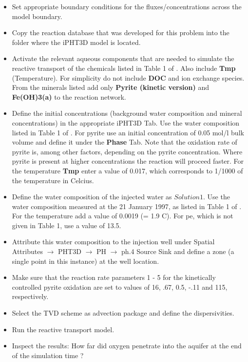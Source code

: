 \begin{itemize}

\item Set appropriate boundary conditions for the fluxes/concentrations across the model boundary. 

\item Copy the reaction database that was developed for this problem into the folder where the iPHT3D model is located. 

\item Activate the relevant aqueous components that are needed to simulate the reactive transport of the chemicals listed in Table 1 of \cite{prommer_stuyfzand_2005}. Also include  {\color{red} \textbf{Tmp}} (Temperature). 
For simplicity do not include  {\color{red} \textbf{DOC}} and ion exchange species. 
From the minerals listed add only  {\color{red} \textbf{Pyrite (kinetic version)}} 
and \\ {\color{red} \textbf{Fe(OH)3(a)}} to the reaction network.  

\item Define the initial concentrations (background water composition and mineral concentrations)
in the appropriate iPHT3D Tab. Use the 
water composition listed in Table 1 of \cite{prommer_stuyfzand_2005}.
For pyrite use an initial concentration of 0.05 mol/l bulk volume and define 
it under the {\color{blue} \textbf{Phase}} Tab.
Note that the oxidation rate of pyrite is, among other factors, depending on the 
pyrite concentration. Where pyrite is present at higher concentrations the reaction
will proceed faster. For the temperature {\color{red} \textbf{Tmp}} enter a value of 0.017, which
corresponds to 1/1000 of the temperature in Celcius.

\item Define the water composition of the injected water as $Solution 1$.
Use the water composition measured at the 21 January 1997, as
listed in Table 1 of \cite{prommer_stuyfzand_2005}. For the temperature add a
value of 0.0019 (= 1.9 C). For pe, which is not given in Table 1, use a value of 13.5.
 
\item Attribute this water composition to the injection well 
under {\color{blue}Spatial Attributes} $\rightarrow$ {\color{blue}PHT3D} $\rightarrow$ {\color{blue}PH} $\rightarrow$ {\color{blue}ph.4 Source \/ Sink} and define a zone 
(a single point in this instance) at the well location. 

\item Make sure that the reaction rate parameters 1 - 5 for the kinetically
controlled pyrite oxidation are set to values of 16, .67, 0.5, -.11 and 115, respectively.

\item Select the TVD scheme as advection package and define the dispersivities.

\item Run the reactive transport model.

\item Inspect the results: How far did oxygen penetrate into the aquifer at the end of the simulation time ?

\end{itemize} 


